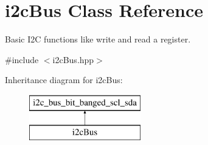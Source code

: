 \hypertarget{classi2c_bus}{}\section{i2c\+Bus Class Reference}
\label{classi2c_bus}


Basic I2C functions like write and read a register.  




{\ttfamily \#include $<$i2c\+Bus.\+hpp$>$}

Inheritance diagram for i2c\+Bus\+:\begin{figure}[H]
\begin{center}
\leavevmode
\includegraphics[height=2.000000cm]{classi2c_bus}
\end{center}
\end{figure}
